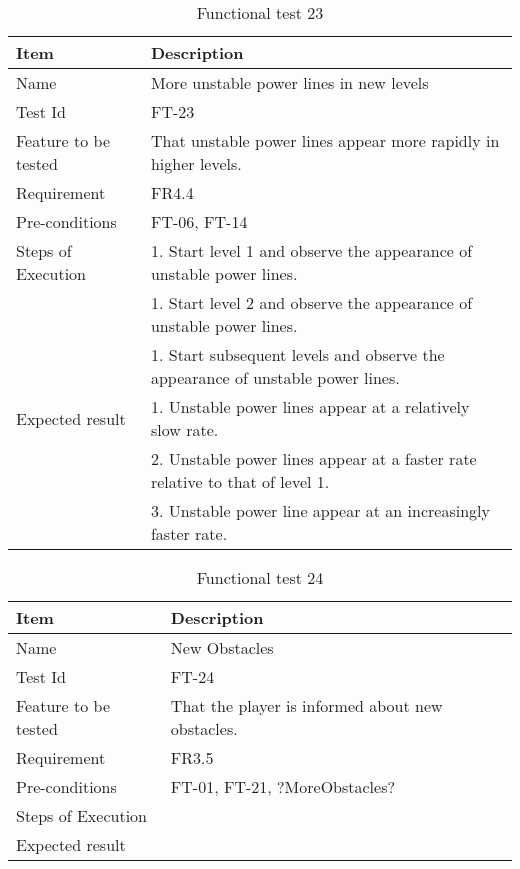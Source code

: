 \begin{table}[H]
\centering
	\begin{tabular}{ l | p{8cm} }
		\hline
		{\bf Item} & {\bf Description} \\ \hline
		Name & More unstable power lines in new levels \\ 
		Test Id & FT-23 \\ 
		Feature to be tested & That unstable power lines appear more rapidly in higher levels. \\ 
		Requirement & FR4.4 \\ 
		Pre-conditions & FT-06, FT-14\\ 
		Steps of Execution & 1. Start level 1 and observe the appearance of unstable power lines. \\
		& 1. Start level 2 and observe the appearance of unstable power lines. \\ 
		& 1. Start subsequent levels and observe the appearance of unstable power lines. \\  
		Expected result & 1. Unstable power lines appear at a relatively slow rate. \\
		& 2. Unstable power lines appear at a faster rate relative to that of level 1. \\
		& 3. Unstable power line appear at an increasingly faster rate. \\
	\end{tabular}
	\caption{Functional test 23}
\end{table}

\begin{table}[H]
\centering
	\begin{tabular}{ l | p{8cm} }
		\hline
		{\bf Item} & {\bf Description} \\ \hline
		Name & New Obstacles \\ 
		Test Id & FT-24 \\ 
		Feature to be tested & That the player is informed about new obstacles. \\ 
		Requirement & FR3.5 \\ 
		Pre-conditions & FT-01, FT-21, ?MoreObstacles?\\ 
		Steps of Execution &  \\ 
		Expected result & \\ 
	\end{tabular}
	\caption{Functional test 24}
\end{table}

